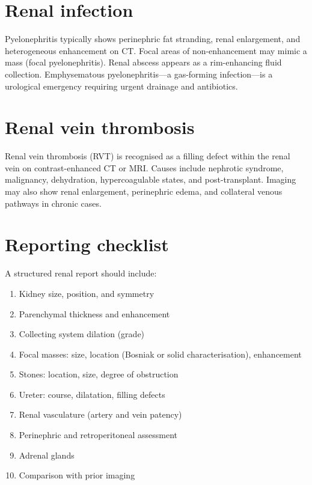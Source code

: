 \section{Renal infection}
Pyelonephritis typically shows perinephric fat stranding, renal enlargement, and heterogeneous enhancement on CT. Focal areas of non-enhancement may mimic a mass (focal pyelonephritis). Renal abscess appears as a rim-enhancing fluid collection. Emphysematous pyelonephritis---a gas-forming infection---is a urological emergency requiring urgent drainage and antibiotics.

\section{Renal vein thrombosis}
Renal vein thrombosis (RVT) is recognised as a filling defect within the renal vein on contrast-enhanced CT or MRI. Causes include nephrotic syndrome, malignancy, dehydration, hypercoagulable states, and post-transplant. Imaging may also show renal enlargement, perinephric edema, and collateral venous pathways in chronic cases.

\section{Reporting checklist}
A structured renal report should include:
\begin{enumerate}
    \item Kidney size, position, and symmetry
    \item Parenchymal thickness and enhancement
    \item Collecting system dilation (grade)
    \item Focal masses: size, location (Bosniak or solid characterisation), enhancement
    \item Stones: location, size, degree of obstruction
    \item Ureter: course, dilatation, filling defects
    \item Renal vasculature (artery and vein patency)
    \item Perinephric and retroperitoneal assessment
    \item Adrenal glands
    \item Comparison with prior imaging
\end{enumerate}

\clearpage
